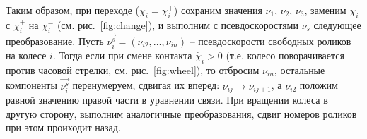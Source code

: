 Таким образом, при переходе ($\chi_i = \chi_i^+$) сохраним значения $\nu_1$, $\nu_2$, $\nu_3$, заменим $\chi_i$ с $\chi_i^+$ на $\chi_i^-$ (см. рис.~\ref{fig:change}), и выполним с псевдоскоростями $\nu_s$ следующее преобразование. Пусть $\vec{\nu_i^s} = (\nu_{i2},\ldots,\nu_{in})$ -- псевдоскорости свободных роликов на колесе $i$. Тогда если при смене контакта $\dot{\chi_i} > 0$ (т.е. колесо поворачивается против часовой стрелки, см. рис.~\ref{fig:wheel}), то отбросим $\nu_{in}$, остальные компоненты $\vec{\nu_i^s}$ перенумеруем, сдвигая их вперед: $\nu_{ij} \rightarrow \nu_{ij+1}$, а $\nu_{i2}$ положим равной значению правой части в уравнении связи. При вращении колеса в другую сторону, выполним аналогичные преобразования, сдвиг номеров роликов при этом проиходит назад.
